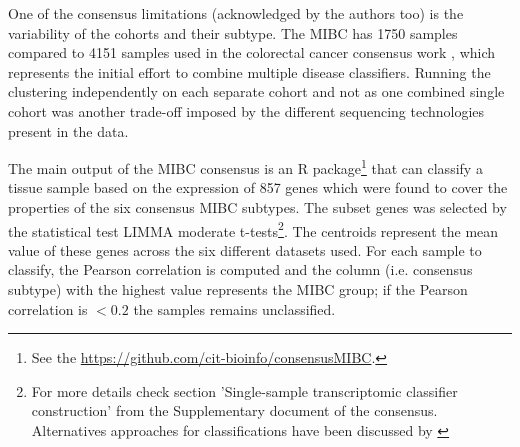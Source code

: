 
One of the consensus limitations (acknowledged by the authors too) is the variability of the cohorts and their subtype. The MIBC has 1750 samples compared to 4151 samples used in the colorectal cancer consensus work \citep{Guinney2015-fy}, which represents the initial effort to combine multiple disease classifiers. Running the clustering independently on each separate cohort and not as one combined single cohort was another trade-off imposed by the different sequencing technologies present in the data. 

The main output of the MIBC consensus is an R package\footnote{See the \url{https://github.com/cit-bioinfo/consensusMIBC}.} that can classify a tissue sample based on the expression of 857 genes which were found to cover the properties of the six consensus MIBC subtypes. The subset genes was selected by the statistical test LIMMA moderate t-tests\footnote{For more details check section 'Single-sample transcriptomic classifier construction' from the Supplementary document of the consensus. Alternatives approaches for classifications have been discussed by \citet{Eriksson2022-vw}}. The centroids represent the mean value of these genes across the six different datasets used. For each sample to classify, the Pearson correlation is computed and the column (i.e. consensus subtype) with the highest value represents the MIBC group; if the Pearson correlation is $<0.2$ the samples remains unclassified. 

